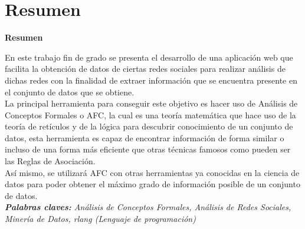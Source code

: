 \documentclass[../../main.tex]{subfiles}
\begin{document}
\makeatletter
\renewenvironment{abstract}{%
    \if@twocolumn
      \section*{Resumen \\}%
    \else %
    \begin{flushright}
        {\filleft\Huge\bfseries\fontsize{48pt}{12}\selectfont Resumen\vspace{\z@}}%
        \end{flushright}
      \quotation
    \fi}
    {\if@twocolumn\else\endquotation\fi}
\makeatother

\begin{abstract}

En este trabajo fin de grado se presenta el desarrollo de una aplicación web que facilita la obtención de datos de ciertas redes sociales para realizar análisis de dichas redes con la finalidad de extraer información que se encuentra presente en el conjunto de datos que se obtiene. \\

La principal herramienta para conseguir este objetivo es hacer uso de Análisis de Conceptos Formales o AFC, la cual es una teoría matemática que hace uso de la teoría de retículos y de la lógica para descubrir conocimiento de un conjunto de datos, esta herramienta es capaz de encontrar información de forma similar o incluso de una forma más eficiente que otras técnicas famosos como pueden ser las Reglas de Asociación. \\

Así mismo, se utilizará AFC con otras herramientas ya conocidas en la ciencia de datos para poder obtener el máximo grado de información posible de un conjunto de datos. \\

\noindent\textit{\textbf{Palabras claves:} Análisis de Conceptos Formales, Análisis de Redes Sociales, Minería de Datos, \gls{rlang} (Lenguaje de programación)}
\end{abstract}
\end{document}
